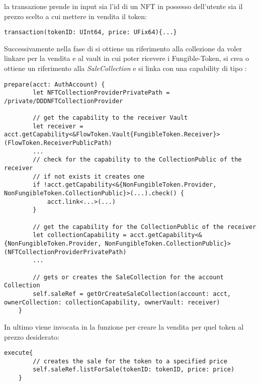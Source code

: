 \subsubsection*{ }la transazione prende in input sia l'id di un NFT in possesso dell'utente sia il prezzo scelto a cui mettere in vendita il token:
\begin{lstlisting}[style=all, style=cadence]
transaction(tokenID: UInt64, price: UFix64){...}
\end{lstlisting}
Successivamente nella fase di  si ottiene un riferimento alla collezione da voler linkare per la vendita e al vault in cui poter ricevere i Fungible-Token, si crea o ottiene un riferimento alla \textit{SaleCollection} e si linka con una capability di tipo :
\begin{lstlisting}[style=all, style=cadence]
prepare(acct: AuthAccount) {
        let NFTCollectionProviderPrivatePath = /private/DDDNFTCollectionProvider

        // get the capability to the receiver Vault
        let receiver = acct.getCapability<&FlowToken.Vault{FungibleToken.Receiver}>(FlowToken.ReceiverPublicPath)
        ...
        // check for the capability to the CollectionPublic of the receiver
        // if not exists it creates one
        if !acct.getCapability<&{NonFungibleToken.Provider, NonFungibleToken.CollectionPublic}>(...).check() {
            acct.link<...>(...)
        }
        
        // get the capability for the CollectionPublic of the receiver
        let collectionCapability = acct.getCapability<&{NonFungibleToken.Provider, NonFungibleToken.CollectionPublic}>(NFTCollectionProviderPrivatePath)
        ...

        // gets or creates the SaleCollection for the account Collection
        self.saleRef = getOrCreateSaleCollection(account: acct, ownerCollection: collectionCapability, ownerVault: receiver)
    }
\end{lstlisting}
In ultimo viene invocata in  la funzione  per creare la vendita per quel token al prezzo desiderato:
\begin{lstlisting}[style=all, style=cadence]
execute{
        // creates the sale for the token to a specified price
        self.saleRef.listForSale(tokenID: tokenID, price: price)
    }
\end{lstlisting}
